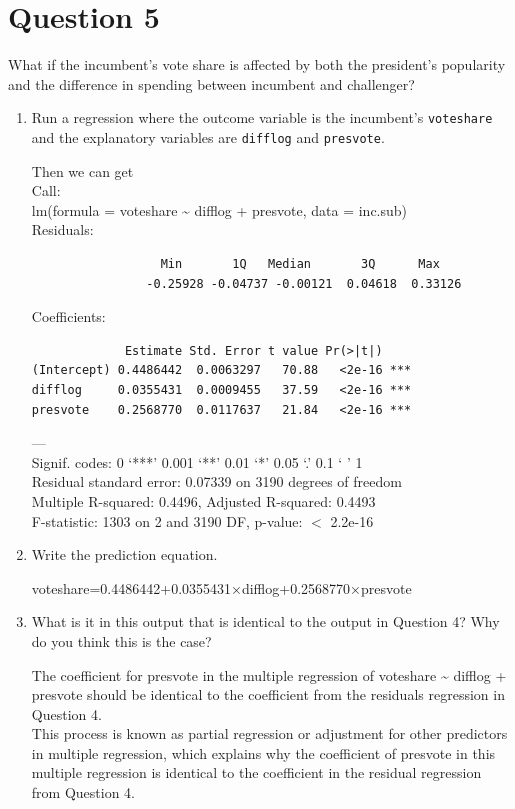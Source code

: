 \documentclass[12pt,letterpaper]{article}
\begin{document}
\section*{Question 5}
\noindent What if the incumbent's vote share is affected by both the president's popularity and the difference in spending between incumbent and challenger? 
	\begin{enumerate}
		\item Run a regression where the outcome variable is the incumbent's \texttt{voteshare} and the explanatory variables are \texttt{difflog} and \texttt{presvote}.	
			 
			
			Then we can get\\
			
			Call:\\
			lm(formula = voteshare \~{} difflog + presvote, data = inc.sub)\\
			
				Residuals:\\
			\begin{verbatim}
				  Min       1Q   Median       3Q      Max 
				-0.25928 -0.04737 -0.00121  0.04618  0.33126 
			\end{verbatim}
			Coefficients:\\
			\begin{verbatim}
             Estimate Std. Error t value Pr(>|t|)    
(Intercept) 0.4486442  0.0063297   70.88   <2e-16 ***
difflog     0.0355431  0.0009455   37.59   <2e-16 ***
presvote    0.2568770  0.0117637   21.84   <2e-16 ***
			\end{verbatim}
			---\\
			Signif. codes:  0 ‘***’ 0.001 ‘**’ 0.01 ‘*’ 0.05 ‘.’ 0.1 ‘ ’ 1\\
			
			Residual standard error: 0.07339 on 3190 degrees of freedom\\
			Multiple R-squared:  0.4496,	Adjusted R-squared:  0.4493 \\
			F-statistic:  1303 on 2 and 3190 DF,  p-value: $<$ 2.2e-16
		\vspace{5cm}
		\item Write the prediction equation.	
		
			voteshare=0.4486442+0.0355431×difflog+0.2568770×presvote
		\vspace{5cm}
		\item What is it in this output that is identical to the output in Question 4? Why do you think this is the case?
		
		The coefficient for presvote in the multiple regression of voteshare \~{} difflog + presvote should be identical to the coefficient from the residuals regression in Question 4.\\
		
		
		This process is known as partial regression or adjustment for other predictors in multiple regression, which explains why the coefficient of presvote in this multiple regression is identical to the coefficient in the residual regression from Question 4.
		
		
	\end{enumerate}
\end{document}
